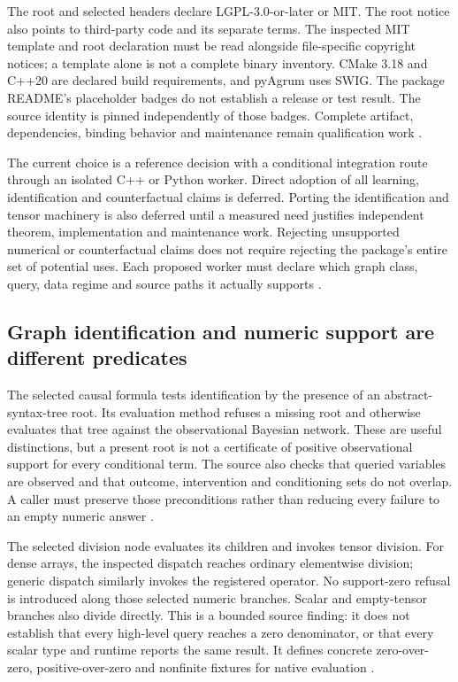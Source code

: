 The root and selected headers declare LGPL-3.0-or-later or MIT. The root
notice also points to third-party code and its separate terms. The inspected
MIT template and root declaration must be read alongside file-specific
copyright notices; a template alone is not a complete binary inventory.
CMake 3.18 and C++20 are declared build requirements, and pyAgrum uses SWIG.
The package README's placeholder badges do not establish a release or test
result. The source identity is pinned independently of those badges.
Complete artifact, dependencies, binding behavior and maintenance remain
qualification work \citep{exec24_agrum_source}.

The current choice is a reference decision with a conditional integration
route through an isolated C++ or Python worker. Direct adoption of all
learning, identification and counterfactual claims is deferred. Porting the
identification and tensor machinery is also deferred until a measured need
justifies independent theorem, implementation and maintenance work.
Rejecting unsupported numerical or counterfactual claims does not require
rejecting the package's entire set of potential uses. Each proposed worker
must declare which graph class, query, data regime and source paths it
actually supports \citep{exec24_agrum_choice}.

\subsection{Graph identification and numeric support are different predicates}
The selected causal formula tests identification by the presence of an
abstract-syntax-tree root. Its evaluation method refuses a missing root and
otherwise evaluates that tree against the observational Bayesian network.
These are useful distinctions, but a present root is not a certificate of
positive observational support for every conditional term. The source also
checks that queried variables are observed and that outcome, intervention
and conditioning sets do not overlap. A caller must preserve those
preconditions rather than reducing every failure to an empty numeric answer
\citep{exec24_agrum_source}.

The selected division node evaluates its children and invokes tensor
division. For dense arrays, the inspected dispatch reaches ordinary
elementwise division; generic dispatch similarly invokes the registered
operator. No support-zero refusal is introduced along those selected
numeric branches. Scalar and empty-tensor branches also divide directly.
This is a bounded source finding: it does not establish that every
high-level query reaches a zero denominator, or that every scalar type and
runtime reports the same result. It defines concrete zero-over-zero,
positive-over-zero and nonfinite fixtures for native evaluation
\citep{exec24_agrum_source,exec24_agrum_choice}.

